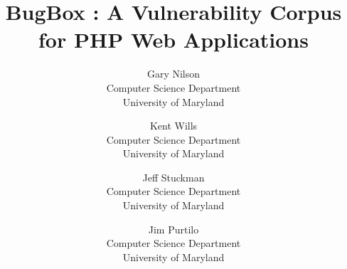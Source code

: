 \documentclass[letterpaper,twocolumn,10pt]{article}
\begin{document}
\date{}


\title{\Large \bf BugBox : A Vulnerability Corpus for PHP Web Applications}


\author{
{\rm Gary Nilson}\\
Computer Science Department\\University of Maryland
\and
{\rm Kent Wills}\\
Computer Science Department\\University of Maryland
\and
{\rm Jeff Stuckman}\\
Computer Science Department\\University of Maryland
\and
{\rm Jim Purtilo}\\
Computer Science Department\\University of Maryland
} %

\maketitle

\thispagestyle{empty}



\end{document}
